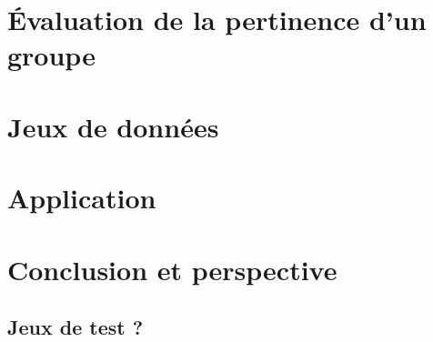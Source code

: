 \section{\'Evaluation de la pertinence d'un groupe}
\label{sec:groupe_dense_method}

\section{Jeux de données}
\label{sec:groupe_dense_data}
\section{Application}
\label{sec:groupe_dense_result}



\section{Conclusion et perspective}


\subsection{Jeux de test ?}